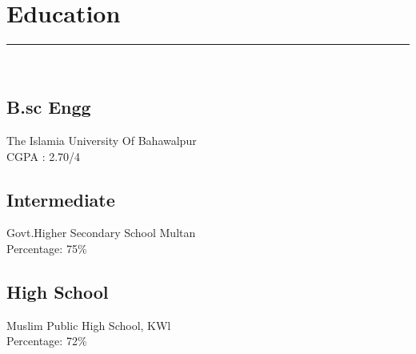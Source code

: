 \documentclass[]{junaid}
\begin{document}
\begin{minipage}[t]{0.33\textwidth}
\section{Education} 
\noindent\rule{5cm}{0.4pt}\\
\subsection{B.sc Engg}
The Islamia University Of Bahawalpur \\
CGPA : 2.70/4\\
\vspace{8pt}
\subsection{Intermediate}
Govt.Higher Secondary School Multan\\
Percentage: 75\%\\
\vspace{8pt}
\subsection{High School}
Muslim Public High School, KWl\\
Percentage: 72\%
\sectionsep
%
%

\end{minipage} 
\hfill
\end{document}
